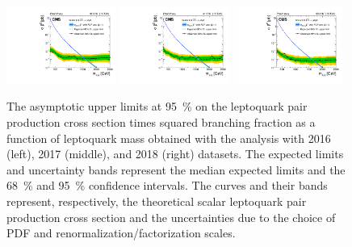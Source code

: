 \begin{figure}[H]
  \centering
  \includegraphics[width=0.32\textwidth]{Images/Analysis/Limits/BR_Sigma_MuMu_2016.pdf}
  \includegraphics[width=0.32\textwidth]{Images/Analysis/Limits/BR_Sigma_MuMu_2017.pdf}
  \includegraphics[width=0.32\textwidth]{Images/Analysis/Limits/BR_Sigma_MuMu_2018.pdf}
  \caption{The asymptotic upper limits at \SI{95}{\%} \CL on the leptoquark pair production cross section times squared branching fraction as a function of leptoquark mass obtained with the \mumubj analysis with 2016 (left), 2017 (middle), and 2018 (right) datasets. The expected limits and uncertainty bands represent the median expected limits and the \SI{68}{\%} and \SI{95}{\%} confidence intervals. The \xsecTheory curves and their bands represent, respectively, the theoretical scalar leptoquark pair production cross section and the uncertainties due to the choice of PDF and renormalization/factorization scales.}
  \label{fig:limit_plots}
\end{figure}

